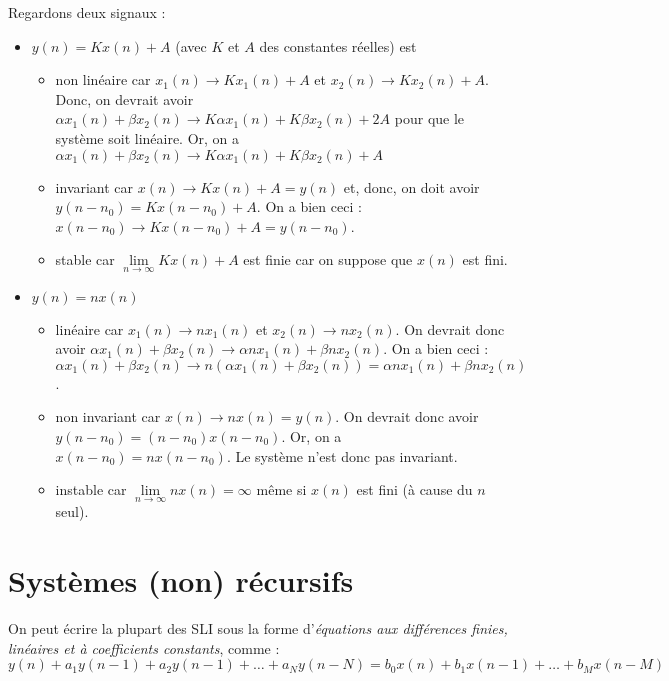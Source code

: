     \begin{exemple}
        Regardons deux signaux :
        \begin{itemize}
            \item $y(n) = Kx(n) + A$ (avec $K$ et $A$ des constantes réelles) est
            \begin{itemize}
                \item non linéaire car $x_1(n) \rightarrow K x_1(n) + A$ et $x_2(n) \rightarrow K x_2(n) + A$. Donc, on devrait avoir $\alpha x_1(n) + \beta x_2(n) \rightarrow K \alpha x_1(n) + K \beta x_2(n) + 2A$ pour que le système soit linéaire. Or, on a $\alpha x_1(n) + \beta x_2(n) \rightarrow K \alpha x_1(n) + K \beta x_2(n) + A$
                \item invariant car $x(n) \rightarrow K x(n) + A = y(n)$ et, donc, on doit avoir $y(n-n_0) = K x(n-n_0) + A$. On a bien ceci : $x(n-n_0) \rightarrow K x(n - n_0) + A = y(n-n_0)$.
                \item stable car $\lim\limits_{n\to\infty} Kx(n) + A$ est finie car on suppose que $x(n)$ est fini.
            \end{itemize}
            \item $y(n) = n x(n)$
            \begin{itemize}
                \item linéaire car $x_1(n) \rightarrow n x_1(n)$ et $x_2(n) \rightarrow n x_2(n)$. On devrait donc avoir $\alpha x_1(n) + \beta x_2(n) \rightarrow \alpha n x_1(n) + \beta n x_2(n)$. On a bien ceci : $\alpha x_1(n) + \beta x_2(n) \rightarrow n (\alpha x_1(n) + \beta x_2(n)) = \alpha n x_1(n) + \beta n x_2(n)$.
                \item non invariant car $x(n) \rightarrow n x(n) = y(n)$. On devrait donc avoir $y(n-n_0) = (n-n_0) x(n-n_0)$. Or, on a $x(n-n_0) = n x(n-n_0)$. Le système n'est donc pas invariant.
                \item instable car $\lim\limits_{n\to\infty} n x(n) = \infty$ même si $x(n)$ est fini (à cause du $n$ seul).
            \end{itemize}
        \end{itemize}
    \end{exemple}

    \section{Systèmes (non) récursifs}
        On peut écrire la plupart des SLI sous la forme d'\textit{équations aux différences finies, linéaires et à coefficients constants}, comme :
        $$
            y(n) + a_1y(n-1) + a_2y(n-1) + \dots + a_N y(n-N) = b_0x(n) + b_1x(n-1) + \dots + b_Mx(n-M)
        $$

